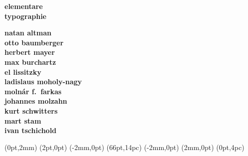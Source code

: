 \documentclass{article}
\begin{document}
  \NewCoffin \result
  \NewCoffin \aaa
  \NewCoffin \bbb
  \NewCoffin \ccc
  \NewCoffin \ddd
  \NewCoffin \eee
  \NewCoffin \fff
  \NewCoffin {}
  \NewCoffin {}
  \NewCoffin {}

\SetHorizontalCoffin \result {}
\SetHorizontalCoffin {}
\SetHorizontalCoffin {}
\SetHorizontalCoffin {}
\SetHorizontalCoffin {}
\SetVerticalCoffin \eee {180pt}
                 {\raggedleft\fontsize{31}{36}\sffamily\bfseries 
                      elementare\\
                      typographie}
\SetVerticalCoffin \fff {140pt}
                 {\raggedright \fontsize{13}{14}\sffamily\bfseries 
                       natan altman \\
                       otto baumberger \\
                       herbert mayer \\
                       max burchartz \\
                       el lissitzky \\
                       ladislaus moholy-nagy \\
                       moln\'ar f.~farkas \\
                       johannes molzahn \\
                       kurt schwitters \\
                       mart stam \\
                       ivan tschichold}
     
\RotateCoffin {}
\RotateCoffin {}

\SetHorizontalCoffin {}
\SetHorizontalCoffin {}
\SetHorizontalCoffin {}


\JoinCoffins \result                \aaa 
\JoinCoffins {} (0pt,2mm)
\JoinCoffins {} \bbb     [B,r](2pt,0pt)
\JoinCoffins {} (-2mm,0pt)
\JoinCoffins {} \ccc     [B,l](66pt,14pc)
\JoinCoffins {} \fff     [t,r](-2mm,0pt)
\JoinCoffins {} (2mm,0pt)
\JoinCoffins {} \eee     [B,r]
\JoinCoffins {} \ddd     [B,r](0pt,4pc)
\end{document}

